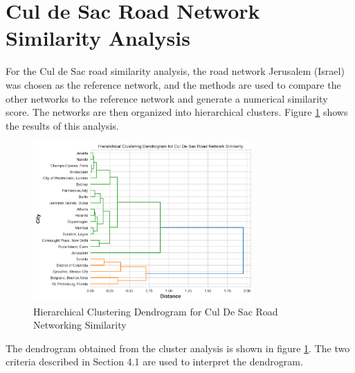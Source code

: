 \section{Cul de Sac Road Network Similarity Analysis}

For the Cul de Sac road similarity analysis, the road network Jerusalem (Israel) was chosen as the reference network, and the methods are used to compare the other networks to the reference network and generate a numerical similarity score. The networks are then organized into hierarchical clusters. Figure \ref{fig:Hierarchical Clustering Dendrogram for Cul De Sac Road Networking Similarity} shows the results of this analysis.

\begin{figure}[!ht]
\centering
\includegraphics[width=0.75\textwidth,center]{picture/Cul De Sac/culdesac_dendrogram2.png}
\caption[Hierarchical Clustering Dendrogram for Cul De Sac Road Networking Similarity]{Hierarchical Clustering Dendrogram for Cul De Sac Road Networking Similarity}
\label{fig:Hierarchical Clustering Dendrogram for Cul De Sac Road Networking Similarity}
\end{figure}

The dendrogram obtained from the cluster analysis is shown in figure \ref{fig:Hierarchical Clustering Dendrogram for Cul De Sac Road Networking Similarity}. The two criteria described in Section 4.1 are used to interpret the dendrogram.

